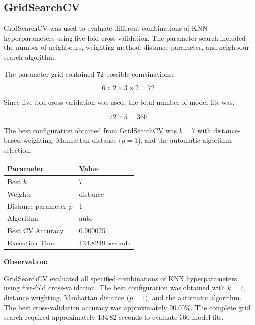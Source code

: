 \documentclass[12pt,a4paper]{article}
\begin{document}
\subsection{GridSearchCV}

GridSearchCV was used to evaluate different combinations of KNN
hyperparameters using five-fold cross-validation. The parameter search
included the number of neighbours, weighting method, distance parameter,
and neighbour-search algorithm.

The parameter grid contained 72 possible combinations:

\[
6 \times 2 \times 3 \times 2 = 72
\]

Since five-fold cross-validation was used, the total number of model
fits was:

\[
72 \times 5 = 360
\]

The best configuration obtained from GridSearchCV was $k=7$ with
distance-based weighting, Manhattan distance ($p=1$), and the automatic
algorithm selection.

\begin{longtable}{|p{6cm}|p{7cm}|}
\hline
\textbf{Parameter} & \textbf{Value} \\ \hline

Best $k$ & 7 \\ \hline

Weights & distance \\ \hline

Distance parameter $p$ & 1 \\ \hline

Algorithm & auto \\ \hline

Best CV Accuracy & 0.900025 \\ \hline

Execution Time & 134.8249 seconds \\ \hline

\end{longtable}

\textbf{Observation:}

GridSearchCV evaluated all specified combinations of KNN
hyperparameters using five-fold cross-validation. The best
configuration was obtained with $k=7$, distance weighting, Manhattan
distance ($p=1$), and the automatic algorithm. The best cross-validation
accuracy was approximately 90.00\%. The complete grid search required
approximately 134.82 seconds to evaluate 360 model fits.

\end{document}
